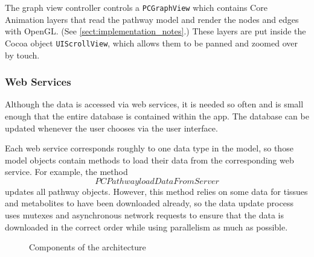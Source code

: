 The graph view controller controls a \texttt{PCGraphView} which contains Core
Animation layers that read the pathway model and render the nodes and edges with
OpenGL. (See \ref{sect:implementation_notes}.) These layers are put inside the
Cocoa object \texttt{UIScrollView}, which allows them to be panned and zoomed
over by touch.

\subsubsection{Web Services}
\label{sect:maw_web_services}

Although the data is accessed via web services, it is needed so often and is
small enough that the entire database is contained within the app. The database
can be updated whenever the user chooses via the user interface.

Each web service corresponds roughly to one data type in the model, so those
model objects contain methods to load their data from the corresponding web
service. For example, the method \texttt{\[PCPathway loadDataFromServer\]}
updates all pathway objects. However, this method relies on some data for
tissues and metabolites to have been downloaded already, so the data update
process uses mutexes and asynchronous network requests to ensure that the data
is downloaded in the correct order while using parallelism as much as possible.


\begin{figure}[p]
    \caption{\label{fig:maw_components} Components of the architecture}
\end{figure}

